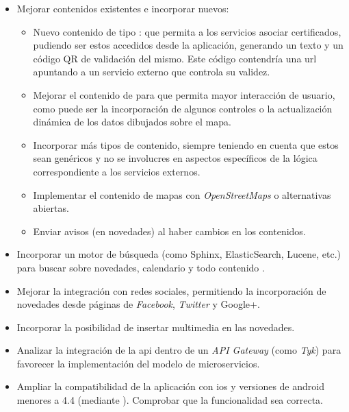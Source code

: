 \begin{itemize}
\item Mejorar contenidos existentes e incorporar nuevos:
\begin{itemize}
\item Nuevo contenido de tipo : que permita a los servicios asociar certificados, pudiendo ser estos accedidos desde la aplicación, generando un texto y un código QR de validación del mismo. Este código contendría una \gls{url} apuntando a un servicio externo que controla su validez. 
\item Mejorar el contenido de  para que permita mayor interacción de usuario, como puede ser la incorporación de algunos controles o la actualización dinámica de los datos dibujados sobre el mapa.
\item Incorporar más tipos de contenido, siempre teniendo en cuenta que estos sean genéricos y no se involucres en aspectos específicos de la lógica correspondiente a los servicios externos.
\item Implementar el contenido de mapas con \textit{OpenStreetMaps} o alternativas abiertas.
\item Enviar avisos (en novedades) al haber cambios en los contenidos.
\end{itemize}
\item Incorporar un motor de búsqueda (como Sphinx, ElasticSearch, Lucene, etc.) para buscar sobre novedades, calendario y todo contenido .
\item Mejorar la integración con redes sociales, permitiendo la incorporación de novedades desde páginas de \textit{Facebook}, \textit{Twitter} y Google+.
\item Incorporar la posibilidad de insertar multimedia en las novedades.
\item Analizar la integración de la \gls{api} dentro de un \textit{API Gateway} (como \textit{Tyk}) para favorecer la implementación del modelo de microservicios.
\item Ampliar la compatibilidad de la aplicación con \gls{ios} y versiones de \gls{android} menores a 4.4 (mediante ). Comprobar que la funcionalidad sea correcta.
\end{itemize}